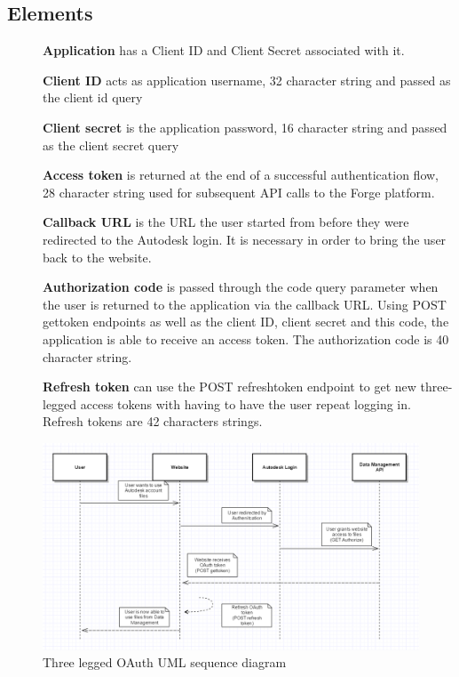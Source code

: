 \documentclass[letterpaper, 10pt, draftclsnofoot, compsoc, onecolumn]{IEEEtran}
\begin{document}
\subsection{Elements}
\begin{description}
	\item[]\textbf{Application} has a Client ID and Client Secret associated with it.
	\item[]\textbf{Client ID} acts as application username, 32 character string and passed as the client id query
	\item[]\textbf{Client secret} is the application password, 16 character string and passed as the client secret query
	\item[]\textbf{Access token} is returned at the end of a successful authentication flow, 28 character string used for subsequent API calls to the Forge platform. 
	\item[]\textbf{Callback URL} is the URL the user started from before they were redirected to the Autodesk login. It is necessary in order to bring the user back to the website.
	\item[]\textbf{Authorization code} is passed through the code query parameter when the user is returned to the application via the callback URL. Using POST gettoken endpoints as well as the client ID, client secret and this code, the application is able to receive an access token. The authorization code is 40 character string.
	\item[]\textbf{Refresh token} can use the POST refreshtoken endpoint to get new three-legged access tokens with having to have the user repeat logging in. Refresh tokens are 42 characters strings.

\end{description}

\begin{figure}[ht]
	\includegraphics[scale=0.55]{Authentication3legged.png}
	\caption{Three legged OAuth UML sequence diagram}
\end{figure}
\end{document}
